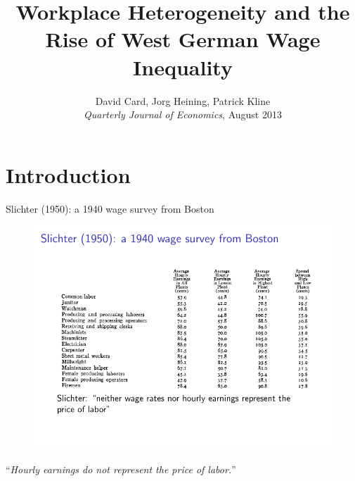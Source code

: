 \documentclass[notes=show]{beamer}
\begin{document}
\title{Workplace Heterogeneity and the Rise of West German Wage Inequality}
\subtitle{}
\date{David Card, Jorg Heining, Patrick Kline \bigskip \\
\textit{Quarterly Journal of Economics}, August 2013}
\author{}
\maketitle


\section{Introduction}

\begin{frame}{Slichter (1950): a 1940 wage survey from Boston}
\begin{figure}[p!]
 \includegraphics[width=\textwidth]{figures/Slichter.pdf} 
\end{figure}
\begin{center}
    ``\textit{Hourly earnings do not represent the price of labor.}''
\end{center}
\end{frame}
\end{document}
